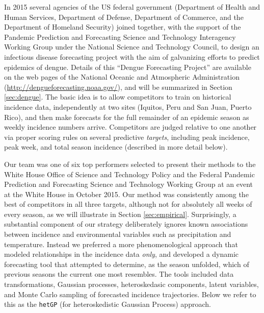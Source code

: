 \documentclass[12pt]{article}
\begin{document}
In 2015 several agencies of the US federal government (Department of Health
and Human Services, Department of Defense, Department of Commerce, and the
Department of Homeland Security) joined together, with the support of the
Pandemic Prediction and Forecasting Science and Technology Interagency Working
Group under the National Science and Technology Council, to design an
infectious disease forecasting project with the aim of galvanizing efforts to
predict epidemics of dengue.  Details of this ``Dengue Forecasting
Project'' are available on the web pages of the National Oceanic and
Atmospheric Administration (\url{http://dengueforecasting.noaa.gov/}), and
will be summarized in Section \ref{sec:dengue}.  The basic idea
is to allow competitors to train on historical incidence data, independently
at two sites (Iquitos, Peru and San Juan, Puerto Rico), and then 
make forecasts for the full remainder of an epidemic season as weekly
incidence numbers arrive.  Competitors are judged relative to one another via
proper scoring rules on several predictive {\em targets}, including peak
incidence, peak week, and total season incidence (described in more detail below). 

Our team was one of six top performers selected to present their methods
to the White House Office of Science and Technology Policy and the Federal
Pandemic Prediction and Forecasting Science and Technology Working Group at an
event at the White House in October 2015.  Our method was consistently among
the best of competitors in all three targets, although not for absolutely all
weeks of every season, as we will illustrate in Section \ref{sec:empirical}.
Surprisingly, a substantial component of our strategy deliberately ignores
known associations between incidence and environmental variables such as
precipitation and temperature.  Instead we preferred a more phenomenological
approach that modeled relationships in the incidence data {\em only}, and
developed a dynamic forecasting tool that attempted to determine, as the
season unfolded, which of previous seasons the current one most resembles. The
tools included data transformations, Gaussian processes, heteroskedasic
components, latent variables, and Monte Carlo sampling of forecasted incidence
trajectories. Below we refer to this as the {\tt hetGP} (for heteroskedistic
Gaussian Process) approach.
\end{document}
